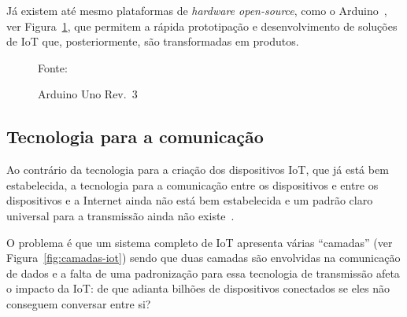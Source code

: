 \documentclass[pdftex, brazil, 12pt, twoside]{article}
\newcommand{\ingles}[1]{\textit{#1}}
\begin{document}
Já existem até mesmo plataformas de \ingles{hardware open-source}, como o
Arduino~\citep{McRobertsArduino2011,JavedArduinoIoT2016,SeneviratneIoTArduino2015,SchwartzESP8266IoT2016,BlumArduino2013,BoxallArduino2013,FitzgeraldShiloh2013}, ver Figura~\ref{fig:arduino-1}, que permitem a rápida prototipação e desenvolvimento de soluções
de IoT que, posteriormente, são transformadas em produtos.

\begin{figure}[!h]
  \begin{center}
    \caption{Arduino Uno Rev.\ 3}
    \label{fig:arduino-1}
    
    \footnotesize{Fonte:~\citet{FitzgeraldShiloh2013}}
  \end{center}
\end{figure}


\subsection{Tecnologia para a comunicação}
\label{tecnologia-iot-comunicacao}

Ao contrário da tecnologia para a criação dos dispositivos IoT, que já está
bem estabelecida, a tecnologia para a comunicação entre os dispositivos e
entre os dispositivos e a Internet ainda não está bem estabelecida e um padrão
claro universal para a transmissão ainda não existe~\citep{NunesLoRaSigfox2017,AlsenMcKinseyIoT2017,LuetMcKinseyIoTPlatforms2017}.

O problema é que um sistema completo de IoT apresenta várias ``camadas''
(ver Figura~\ref{fig:camadas-iot}) sendo que duas camadas são envolvidas na comunicação de dados
e a falta de uma padronização para essa tecnologia de transmissão afeta o
impacto da IoT: de que adianta bilhões de dispositivos conectados se eles não
conseguem conversar entre si?
\end{document}
